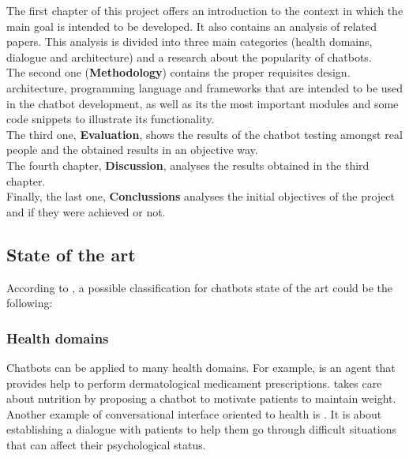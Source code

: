 \documentclass[12pt,english]{article}
\begin{document}
The first chapter of this project offers an introduction to the context in which the main goal is intended to be developed. It also contains an analysis of related papers. This analysis is divided into three main categories (health domains, dialogue and architecture) and a research about the popularity of chatbots.\\

The second one (\textbf{Methodology}) contains the proper requisites design. architecture, programming language and frameworks that are intended to be used in the chatbot development, as well as its the most important modules and some code snippets to illustrate its functionality.\\

The third one, \textbf{Evaluation}, shows the results of the chatbot testing amongst real people and the obtained results in an objective way.\\

The fourth chapter, \textbf{Discussion}, analyses the results obtained in the third chapter.\\

Finally, the last one, \textbf{Conclussions} analyses the initial objectives of the project and if they were achieved or not.



\newpage

\subsection{State of the art}

According to \cite{Montenegro201956}, a possible classification for chatbots state of the art could be the following:

\subsubsection{Health domains}

Chatbots can be applied to many health domains. For example, \cite{Alesanco2017185} is an agent that provides help to perform dermatological medicament prescriptions. \cite{BennetPraba20193470} takes care about nutrition by proposing a chatbot to motivate patients to maintain weight. Another example of conversational interface oriented to health is \cite{Falala-Sechet2019236}. It is about establishing a dialogue with patients to help them go through difficult situations that can affect their psychological status.\\
\end{document}
